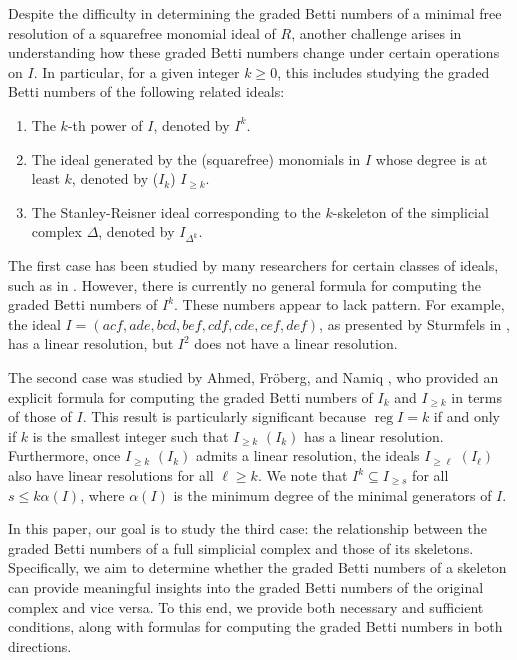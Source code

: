 \documentclass[a4paper,12pt]{amsart}
\numberwithin{equation}{section}
\theoremstyle{definition}
\DeclareMathOperator{\reg}{reg}
\begin{document}
Despite the difficulty in determining the graded Betti numbers of a minimal free resolution of a squarefree monomial ideal of $R$, another challenge arises in understanding how these graded Betti numbers change under certain operations on 
$I$. In particular, for a given integer $k\ge0$, this includes studying the graded Betti numbers of the following related ideals:
\begin{enumerate}
	\item The $k$-th power of $I$, denoted by $I^k$.
	\item The ideal generated by the (squarefree) monomials in $I$ whose degree is at least $k$, denoted by ($I_k$) $I_{\ge k}$.
	\item The Stanley-Reisner ideal corresponding to the $k$-skeleton of the simplicial complex $\Delta$, denoted by $I_{\Delta^k}$.
\end{enumerate}
The first case has been studied by many researchers for certain classes of ideals, such as in \cite{Banerjee2015,BeyarslanHaTrung2015,CutkoskyHerzogTrung1999, HerzogHibiZheng20042,JayanthanSelvaraja2021,NevoPeeva2013,Romer2001}. However, there is currently no general formula for computing the graded Betti numbers of $I^k$.  These numbers appear to lack pattern. For example, the ideal $I=(acf,ade,bcd,bef,cdf,cde,cef,def)$, as presented by Sturmfels in \cite{Sturmfels2000}, has a linear resolution, but $I^2$ does not have a linear resolution.

The second case was studied by Ahmed, Fröberg, and Namiq \cite{AhmedFrobergNamiq2023}, who provided an explicit formula for computing the graded Betti numbers of $I_k$ and $I_{\ge k}$ in terms of those of $I$. This result is particularly significant because $\reg I=k$ if and only if $k$ is the smallest integer such that $I_{\ge k}$ $(I_k)$ has a linear resolution. Furthermore, once $I_{\ge k}$ $(I_k)$ admits a linear resolution, the ideals $I_{\ge\ell}$ $(I_\ell)$ also have linear resolutions for all $\ell\geq k$. We note that $I^k\subseteq I_{\ge s}$ for all $s\le k\alpha(I)$, where $\alpha(I)$ is the minimum degree of the minimal generators of $I$.

In this paper, our goal is to study the third case: the relationship between the graded Betti numbers of a full simplicial complex and those of its skeletons. Specifically, we aim to determine whether the graded Betti numbers of a skeleton can provide meaningful insights into the graded Betti numbers of the original complex and vice versa. To this end, we provide both necessary and sufficient conditions, along with formulas for computing the graded Betti numbers in both directions.
\end{document}
